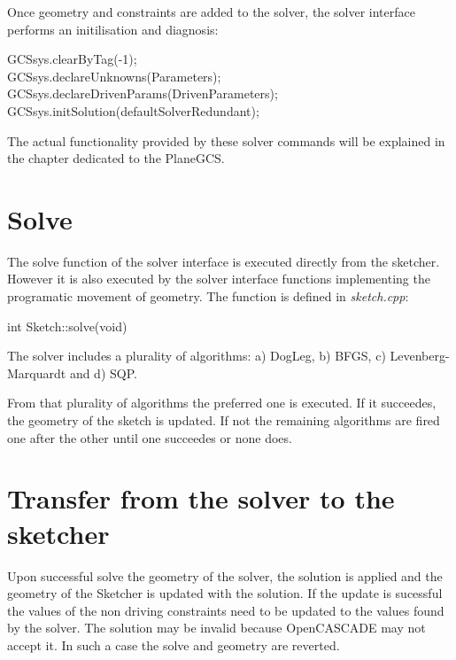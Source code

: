 \documentclass[12pt,twoside,a4paper]{book}
\begin{document}
    Once geometry and constraints are added to the solver, the solver interface performs an initilisation and diagnosis:

    \begin{codequote}
    GCSsys.clearByTag(-1);\\
    GCSsys.declareUnknowns(Parameters);\\
    GCSsys.declareDrivenParams(DrivenParameters);\\
    GCSsys.initSolution(defaultSolverRedundant);
    \end{codequote}

    The actual functionality provided by these solver commands will be explained in the chapter dedicated to the PlaneGCS.

    \section{Solve}
    \label{sec:Solver:solve}
    The solve function of the solver interface is executed directly from the sketcher. However it is also executed by the solver interface functions implementing the programatic movement of geometry. The function is defined in \emph{sketch.cpp}:

    \begin{codequote}
        int Sketch::solve(void)
    \end{codequote}

    The solver includes a plurality of algorithms: a) DogLeg, b) BFGS, c) Levenberg-Marquardt and d) SQP.

    From that plurality of algorithms the preferred one is executed. If it succeedes, the geometry of the sketch is updated. If not the remaining algorithms are fired one after the other until one succeedes or none does.

    \section{Transfer from the solver to the sketcher}

    Upon successful solve the geometry of the solver, the solution is applied and the geometry of the Sketcher is updated with the solution. If the update is sucessful the values of the non driving constraints need to be updated to the values found by the solver. The solution may be invalid because OpenCASCADE may not accept it. In such a case the solve and geometry are reverted.
\end{document}
